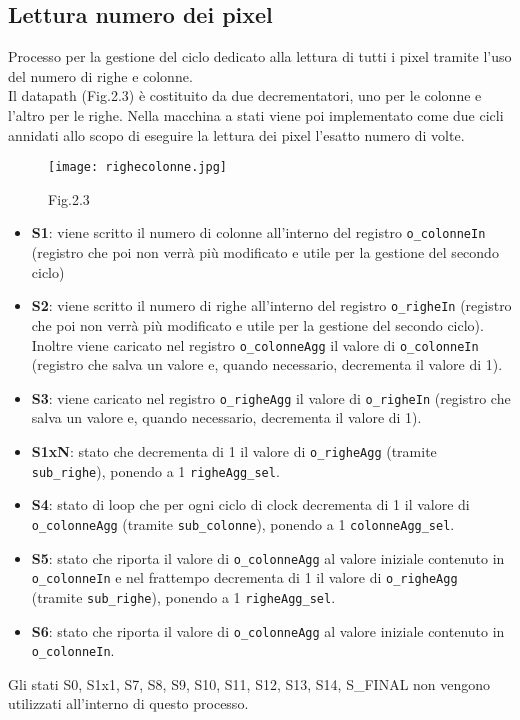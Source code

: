 \documentclass[12pt, table, xcdraw]{article}
\begin{document}
\newpage
\subsection{Lettura numero dei pixel}
Processo per la gestione del ciclo dedicato alla lettura di tutti i pixel tramite l'uso del numero di righe e colonne.\\
Il datapath (Fig.2.3) è costituito da due decrementatori, uno per le colonne e l'altro per le righe. Nella 
macchina a stati viene poi implementato come due cicli annidati allo scopo di eseguire la lettura dei 
pixel l'esatto numero di volte.

\begin{figure}[h!]
  \texttt{[image: righecolonne.jpg]}
\caption*{Fig.2.3}
\end{figure}
\FloatBarrier

\begin{itemize}
\item \textbf{S1}: viene scritto il numero di colonne all'interno del registro \texttt{o\_colonneIn} (registro che poi non verrà più modificato e utile per la gestione del secondo ciclo)
\item \textbf{S2}: viene scritto il numero di righe all'interno del registro \texttt{o\_righeIn} (registro che poi non verrà più modificato e utile per la gestione del secondo ciclo). Inoltre viene caricato nel registro \texttt{o\_colonneAgg} il valore di \texttt{o\_colonneIn} (registro che salva un valore e, quando necessario, decrementa il valore di 1). 
\item \textbf{S3}: viene caricato nel registro \texttt{o\_righeAgg} il valore di \texttt{o\_righeIn} (registro che salva un valore e, quando necessario, decrementa il valore di 1).
\item \textbf{S1xN}: stato che decrementa di 1 il valore di \texttt{o\_righeAgg} (tramite \texttt{sub\_righe}), ponendo a 1 \texttt{righeAgg\_sel}.
\item \textbf{S4}: stato di loop che per ogni ciclo di clock decrementa di 1 il valore di \texttt{o\_colonneAgg} (tramite \texttt{sub\_colonne}), ponendo a 1 \texttt{colonneAgg\_sel}. 
\item \textbf{S5}: stato che riporta il valore di \texttt{o\_colonneAgg} al valore iniziale contenuto in \texttt{o\_colonneIn} e nel frattempo decrementa di 1 il valore di \texttt{o\_righeAgg} (tramite \texttt{sub\_righe}), ponendo a 1 \texttt{righeAgg\_sel}.
\item \textbf{S6}: stato che riporta il valore di \texttt{o\_colonneAgg} al valore iniziale contenuto in \texttt{o\_colonneIn}.
\end{itemize}
Gli stati S0, S1x1, S7, S8, S9, S10, S11, S12, S13, S14, S\_FINAL non vengono utilizzati all'interno di questo processo.
\end{document}
